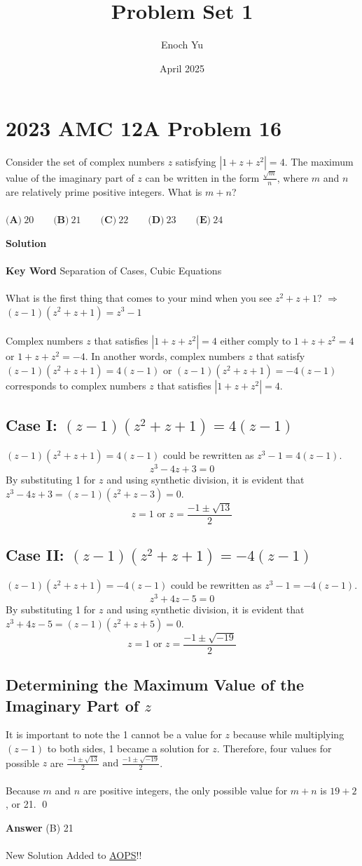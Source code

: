 \documentclass{article}
\title{Problem Set 1}
\author{Enoch Yu}
\date{April 2025}
\newenvironment{solution}{\begin{trivlist}\item[]{\bf Solution}}{\qed \end{trivlist}}
\begin{document}
\section*{2023 AMC 12A Problem 16}
Consider the set of complex numbers $z$ satisfying $|1+z+z^{2}|=4$. The maximum value of the imaginary part of $z$ can be written in the form $\frac{\sqrt{m}}{n}$, where $m$ and $n$ are relatively prime positive integers. What is $m+n$?
\\\\
$\textbf{(A)}~20\qquad\textbf{(B)}~21\qquad\textbf{(C)}~22\qquad\textbf{(D)}~23\qquad\textbf{(E)}~24$

\begin{solution}
\\\\
\textbf{Key Word} Separation of Cases, Cubic Equations
\\\\
What is the first thing that comes to your mind when you see $z^2+z+1$? $\Rightarrow$ $(z-1)(z^2+z+1)=z^3-1$
\\\\
Complex numbers $z$ that satisfies $|1+z+z^{2}|=4$ either comply to $1+z+z^{2}=4$ or $1+z+z^{2}=-4$. In another words, complex numbers $z$ that satisfy $(z-1)(z^2+z+1)=4(z-1)$ or $(z-1)(z^2+z+1)=-4(z-1)$ corresponds to complex numbers $z$ that satisfies $|1+z+z^{2}|=4$.
\subsection*{Case I: $(z-1)(z^2+z+1)=4(z-1)$}
$(z-1)(z^2+z+1)=4(z-1)$ could be rewritten as $z^3-1=4(z-1)$.
\[
z^3-4z+3=0
\]
By substituting 1 for $z$ and using synthetic division, it is evident that $z^3-4z+3=(z-1)(z^2+z-3)=0$.
\[
z=1 \text{ or } z=\frac{-1\pm\sqrt{13}}{2}
\]

\subsection*{Case II: $(z-1)(z^2+z+1)=-4(z-1)$}
$(z-1)(z^2+z+1)=-4(z-1)$ could be rewritten as $z^3-1=-4(z-1)$.
\[
z^3+4z-5=0
\]
By substituting 1 for $z$ and using synthetic division, it is evident that $z^3+4z-5=(z-1)(z^2+z+5)=0$.
\[
z=1 \text{ or } z=\frac{-1\pm\sqrt{-19}}{2}
\]

\subsection*{Determining the Maximum Value of the Imaginary Part of $z$}
It is important to note the 1 cannot be a value for $z$ because while multiplying $(z-1)$ to both sides, 1 became a solution for $z$. Therefore, four values for possible $z$ are $\frac{-1\pm\sqrt{13}}{2} \text{ and } \frac{-1\pm\sqrt{-19}}{2}$.
\\\\
Because $m$ and $n$ are positive integers, the only possible value for $m+n$ is $19+2$, or 21.
\end{solution}
\textbf{Answer} (B) 21
\\\\
New Solution Added to \href{https://artofproblemsolving.com/wiki/index.php/2023_AMC_12A_Problems/Problem_16}{AOPS}!!
\end{document}
